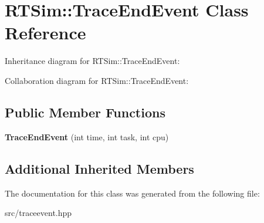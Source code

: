 \hypertarget{classRTSim_1_1TraceEndEvent}{}\section{R\+T\+Sim\+:\+:Trace\+End\+Event Class Reference}
\label{classRTSim_1_1TraceEndEvent}


Inheritance diagram for R\+T\+Sim\+:\+:Trace\+End\+Event\+:


Collaboration diagram for R\+T\+Sim\+:\+:Trace\+End\+Event\+:
\subsection*{Public Member Functions}
\begin{DoxyCompactItemize}
\item 
{\bfseries Trace\+End\+Event} (int time, int task, int cpu)\hypertarget{classRTSim_1_1TraceEndEvent_a3d2e5a9c8ac49fa6a780b7e63fbf7add}{}\label{classRTSim_1_1TraceEndEvent_a3d2e5a9c8ac49fa6a780b7e63fbf7add}

\end{DoxyCompactItemize}
\subsection*{Additional Inherited Members}


The documentation for this class was generated from the following file\+:\begin{DoxyCompactItemize}
\item 
src/traceevent.\+hpp\end{DoxyCompactItemize}

